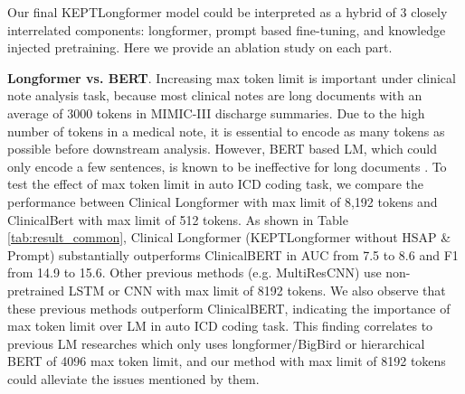 \documentclass[11pt]{article}
\begin{document}
Our final KEPTLongformer model could be interpreted as a hybrid of 3 closely interrelated components:
longformer, prompt based fine-tuning, and knowledge injected pretraining. Here we provide an ablation study on each part.

\noindent \textbf{Longformer vs. BERT}.
Increasing max token limit is important under clinical note analysis task, because most clinical notes are long documents with an average of 3000 tokens in MIMIC-III discharge summaries.
Due to the high number of tokens in a medical note, it is essential to encode as many tokens as possible before downstream analysis. However, BERT based LM, which could only encode a few sentences, is known to be ineffective for long documents \citep{Beltagy2020LongformerTL}. To test the effect of max token limit in auto ICD coding task, we compare the performance between Clinical Longformer with max limit of 8,192 tokens and ClinicalBert with max limit of 512 tokens. As shown in Table \ref{tab:result_common}, Clinical Longformer (KEPTLongformer without HSAP \& Prompt) substantially outperforms ClinicalBERT in AUC from 7.5 to 8.6 and F1 from 14.9 to 15.6. 
Other previous methods (e.g. MultiResCNN) use non-pretrained LSTM or CNN with max limit of 8192 tokens.
We also observe that these previous methods outperform ClinicalBERT, indicating the importance of max token limit over LM in auto ICD coding task. This finding correlates to previous LM researches \cite{zhang-etal-2020-bert, pascual-etal-2021-towards, Biswas2021TransICDTB} which only uses longformer/BigBird \citep{Michalopoulos2022ICDBigBirdAC} or hierarchical BERT \citep{Ji2021DoesTM, Dai2022RevisitingTM} of 4096 max token limit, and our method with max limit of 8192 tokens could alleviate the issues mentioned by them.
\end{document}
